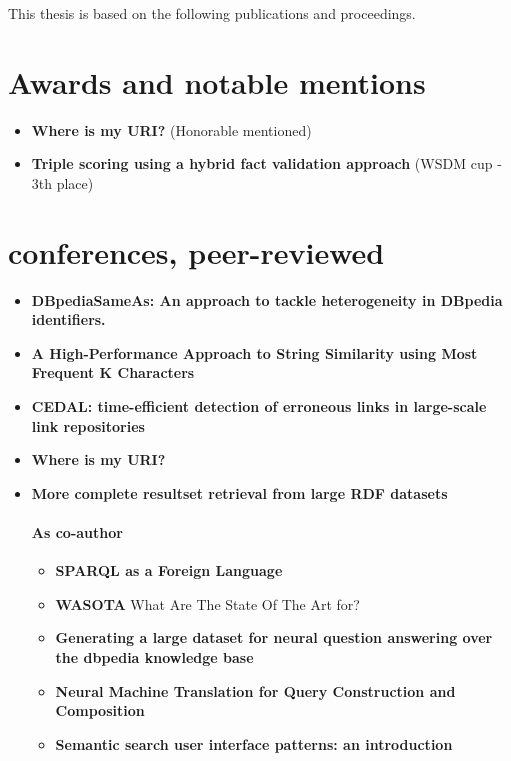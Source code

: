 This thesis is based on the following publications and proceedings.

\section{Awards and notable mentions}

\begin{itemize}
    \item \textbf{Where is my URI?} (Honorable mentioned) \cite{valdestilhas2018my}
    \item \textbf{Triple scoring using a hybrid fact validation approach} (WSDM cup - 3th place) \cite{marx2017triple}
\end{itemize}

\section{conferences, peer-reviewed}

\begin{itemize}
    \item \textbf{DBpediaSameAs: An approach to tackle heterogeneity in DBpedia identifiers.} \cite{valdestilhas2015dbpediasameas}
    \item \textbf{A High-Performance Approach to String Similarity using Most Frequent K Characters} \cite{valdestilhas2017high}
    \item \textbf{CEDAL: time-efficient detection of erroneous links in large-scale link repositories} \cite{valdestilhas2017cedal}
    \item \textbf{Where is my URI?} \cite{valdestilhas2018my}
    \item \textbf{More complete resultset retrieval from large RDF datasets} \cite{ValdestilhasKcap}
    \paragraph{As co-author}
    \begin{itemize}
        \item \textbf{SPARQL as a Foreign Language} \cite{soru2017sparql}
        \item \textbf{WASOTA} What Are The State Of The Art for? \cite{neto2016wasota}
        \item \textbf{Generating a large dataset for neural question answering over the dbpedia knowledge base}        \cite{hartmann2018generating}
        \item \textbf{Neural Machine Translation for Query Construction and Composition} \cite{soru2018neural}
        \item \textbf{Semantic search user interface patterns: an introduction} \cite{marx2017semantic}
    \end{itemize}
\end{itemize}

